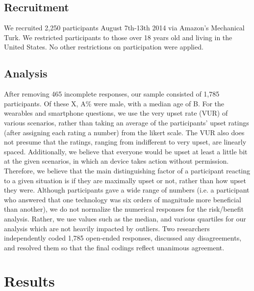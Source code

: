 \documentclass{acm_proc_article-sp}
\begin{document}
\subsection{Recruitment}
We recruited 2,250 participants August 7th-13th 2014 via Amazon's Mechanical Turk. We restricted participants to those over 18 years old and living in the United States. No other restrictions on participation were applied. 

\subsection{Analysis}
After removing 465 incomplete responses, our sample consisted of 1,785 participants. Of these X, A\% were male, with a median age of B. For the wearables and smartphone questions, we use the very upset rate (VUR) of various scenarios, rather than taking an average of the participants' upset ratings (after assigning each rating a number) from the likert scale. The VUR also does not presume that the ratings, ranging from indifferent to very upset, are linearly spaced. Additionally, we believe that everyone would be upset at least a little bit at the given scenarios, in which an device takes action without permission. Therefore, we believe that the main distinguishing factor of a participant reacting to a given situation is if they are maximally upset or not, rather than how upset they were. Although participants gave a wide range of numbers (i.e. a participant who answered that one technology was six orders of magnitude more beneficial than another), we do not normalize the numerical responses for the risk/benefit analysis. Rather, we use values such as the median, and various quartiles for our analysis which are not heavily impacted by outliers. Two researchers independently coded 1,785 open-ended responses, discussed any disagreements, and resolved them so that the final codings reflect unanimous agreement.


\section{Results}

\end{document}
